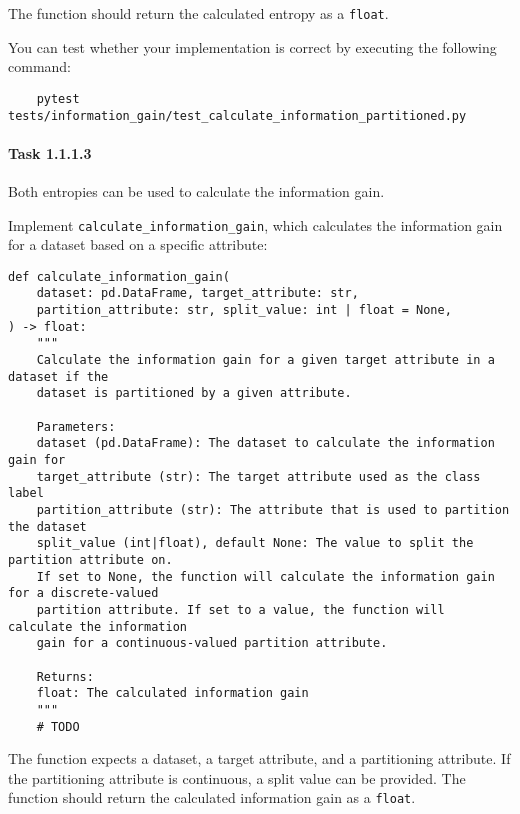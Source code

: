 \documentclass[
english,
smallborders
]{i6prcsht}
\begin{document}
The function should return the calculated entropy as a \texttt{float}.

You can test whether your implementation is correct by executing the following command:

\vspace*{0.3cm}

\begin{lstlisting}
	pytest tests/information_gain/test_calculate_information_partitioned.py
\end{lstlisting}

\vspace*{0.1cm}

\paragraph*{Task 1.1.1.3} \hfill

Both entropies can be used to calculate the information gain.

Implement \texttt{calculate\_information\_gain}, which calculates the information gain for a dataset based on a specific attribute:

\vspace*{0.3cm}

\begin{lstlisting}
def calculate_information_gain(
	dataset: pd.DataFrame, target_attribute: str,
	partition_attribute: str, split_value: int | float = None,
) -> float:
	"""
	Calculate the information gain for a given target attribute in a dataset if the
	dataset is partitioned by a given attribute.

	Parameters:
	dataset (pd.DataFrame): The dataset to calculate the information gain for
	target_attribute (str): The target attribute used as the class label
	partition_attribute (str): The attribute that is used to partition the dataset
	split_value (int|float), default None: The value to split the partition attribute on.
	If set to None, the function will calculate the information gain for a discrete-valued
	partition attribute. If set to a value, the function will calculate the information
	gain for a continuous-valued partition attribute.

	Returns:
	float: The calculated information gain
	"""
	# TODO
\end{lstlisting}

\vspace*{0.1cm}

The function expects a dataset, a target attribute, and a partitioning attribute. If the partitioning attribute is continuous, a split value can be provided. The function should return the calculated information gain as a \texttt{float}.
\end{document}

